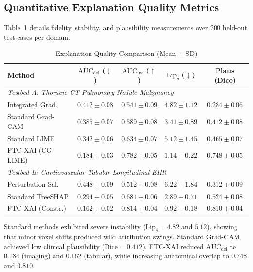\documentclass[10pt,journal,compsoc]{IEEEtran}
\begin{document}
\subsection{Quantitative Explanation Quality Metrics}
Table~\ref{tab:xai_quality} details fidelity, stability, and plausibility measurements over 200 held-out test cases per domain.

\begin{table}[htbp]
\caption{Explanation Quality Comparison (Mean $\pm$ SD)}
\label{tab:xai_quality}
\centering
\begin{tabular}{lcccc}
\toprule
Method & $\text{AUC}_{\text{del}}$ ($\downarrow$) & $\text{AUC}_{\text{ins}}$ ($\uparrow$) & $\text{Lip}_{\delta}$ ($\downarrow$) & Plaus (Dice) \\
\midrule
\multicolumn{5}{l}{\textit{Testbed A: Thoracic CT Pulmonary Nodule Malignancy}} \\
Integrated Grad. & $0.412 \pm 0.08$ & $0.541 \pm 0.09$ & $4.82 \pm 1.12$ & $0.284 \pm 0.06$ \\
Standard Grad-CAM & $0.385 \pm 0.07$ & $0.589 \pm 0.08$ & $3.41 \pm 0.89$ & $0.412 \pm 0.08$ \\
Standard LIME & $0.342 \pm 0.06$ & $0.634 \pm 0.07$ & $5.12 \pm 1.45$ & $0.465 \pm 0.07$ \\
FTC-XAI (CG-LIME) & $\mathbf{0.184} \pm 0.03$ & $\mathbf{0.782} \pm 0.05$ & $\mathbf{1.14} \pm 0.22$ & $\mathbf{0.748} \pm 0.05$ \\
\midrule
\multicolumn{5}{l}{\textit{Testbed B: Cardiovascular Tabular Longitudinal EHR}} \\
Perturbation Sal. & $0.448 \pm 0.09$ & $0.512 \pm 0.08$ & $6.22 \pm 1.84$ & $0.312 \pm 0.09$ \\
Standard TreeSHAP & $0.294 \pm 0.05$ & $0.681 \pm 0.06$ & $2.89 \pm 0.71$ & $0.524 \pm 0.08$ \\
FTC-XAI (Constr.) & $\mathbf{0.162} \pm 0.02$ & $\mathbf{0.814} \pm 0.04$ & $\mathbf{0.92} \pm 0.18$ & $\mathbf{0.810} \pm 0.04$ \\
\bottomrule
\end{tabular}
\end{table}

Standard methods exhibited severe instability ($\text{Lip}_\delta = 4.82$ and $5.12$), showing that minor voxel shifts produced wild attribution swings. Standard Grad-CAM achieved low clinical plausibility ($\text{Dice} = 0.412$). FTC-XAI reduced $\text{AUC}_{\text{del}}$ to $0.184$ (imaging) and $0.162$ (tabular), while increasing anatomical overlap to $0.748$ and $0.810$.
\end{document}
